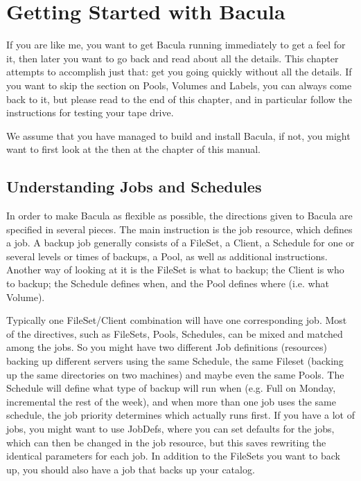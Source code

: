 
\chapter{Getting Started with Bacula}
\label{QuickStartChapter}

If you are like me, you want to get Bacula running immediately to get a feel
for it, then later you want to go back and read about all the details. This
chapter attempts to accomplish just that: get you going quickly without all
the details. If you want to skip the section on Pools, Volumes and Labels, you
can always come back to it, but please read to the end of this chapter, and in
particular follow the instructions for testing your tape drive. 

We assume that you have managed to build and install Bacula, if not, you might
want to first look at the 
 then at the 
 chapter of
this manual. 

\label{JobsandSchedules}
\section{Understanding Jobs and Schedules}

In order to make Bacula as flexible as possible, the directions given 
to Bacula are specified in several pieces.  The main instruction is the 
job resource, which defines a job.  A backup job generally consists of a 
FileSet, a Client, a Schedule for one or several levels or times of backups, 
a Pool, as well as additional instructions. Another way of looking
at it is the FileSet is what to backup; the Client is who to backup; the
Schedule defines when, and the Pool defines where (i.e. what Volume).

Typically one FileSet/Client combination will have one corresponding job.
Most of the directives, such as FileSets, Pools, Schedules, can be mixed
and matched among the jobs.  So you might have two different Job
definitions (resources) backing up different servers using the same
Schedule, the same Fileset (backing up the same directories on two machines)
and maybe even the same Pools.  The Schedule will define what type of
backup will run when (e.g. Full on Monday, incremental the rest of the
week), and when more than one job uses the same schedule, the job priority
determines which actually runs first.  If you have a lot of jobs, you might
want to use JobDefs, where you can set defaults for the jobs, which can
then be changed in the job resource, but this saves rewriting the
identical parameters for each job.  In addition to the FileSets you want to
back up, you should also have a job that backs up your catalog.

